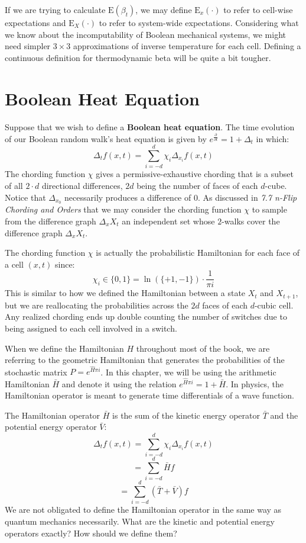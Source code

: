 \documentclass[10pt, a5paper, twoside, openright]{memoir}
\begin{document}
If we are trying to calculate $\mathrm{E}(\beta_t)$, we may define $\mathrm{E}_x(\cdot)$ to refer to cell-wise expectations and $\mathrm{E}_X(\cdot)$ to refer to system-wide expectations. Considering what we know about the incomputability of Boolean mechanical systems, we might need simpler $3 \times 3$ approximations of inverse temperature for each cell. Defining a continuous definition for thermodynamic beta will be quite a bit tougher.

\section{Boolean Heat Equation}
Suppose that we wish to define a \textbf{Boolean heat equation}. The time evolution of our Boolean random walk's heat equation is given by $e^{\frac{\partial}{\partial t}} = 1 + \Delta_t$ in which:
$$\Delta_t f(x, t) = \sum\limits_{i=-d}^{d} \chi_i \Delta_{x_i} f(x,t)$$
The chording function $\chi$ gives a permissive-exhaustive chording that is a subset of all $2\cdot d$ directional differences, $2 d$ being the number of faces of each $d$-cube. Notice that $\Delta_{x_0}$ necessarily produces a difference of $0$. As discussed in \textit{7.7 n-Flip Chording and Orders} that we may consider the chording function $\chi$ to sample from the difference graph $\Delta_x X_t$ an independent set whose $2$-walks cover the difference graph $\Delta_x X_t$.

The chording function $\chi$ is actually the probabilistic Hamiltonian for each face of a cell $(x,t)$ since:
$$\chi_i \in \{0, 1\} = \ln(\{+1, -1\}) \cdot \frac{1}{\pi i}$$
This is similar to how we defined the Hamiltonian between a state $X_t$ and $X_{t+1}$, but we are reallocating the probabilities across the $2 d$ faces of each $d$-cubic cell. Any realized chording ends up double counting the number of switches due to being assigned to each cell involved in a switch.

When we define the Hamiltonian $H$ throughout most of the book, we are referring to the geometric Hamiltonian that generates the probabilities of the stochastic matrix $P = e^{\hat H \pi i}$. In this chapter, we will be using the arithmetic Hamiltonian $\bar H$ and denote it using the relation $e^{\hat H \pi i} = 1+\bar H$. In physics, the Hamiltonian operator is meant to generate time differentials of a wave function.

The Hamiltonian operator $\bar H$ is the sum of the kinetic energy operator $\bar T$ and the potential energy operator $\bar V$:
$$\Delta_t f(x, t) = \sum\limits_{i=-d}^{d} \chi_i \Delta_{x_i} f(x,t)$$
$$ = \sum\limits_{i=-d}^{d} \bar H f$$
$$ = \sum\limits_{i=-d}^{d} (\bar T + \bar V) f$$
We are not obligated to define the Hamiltonian operator in the same way as quantum mechanics necessarily. What are the kinetic and potential energy operators exactly? How should we define them? 
\end{document}

